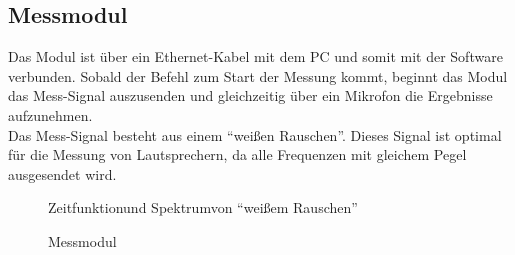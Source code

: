 \newpage
\subsection{Messmodul}\label{subsec:5.2.2}
Das Modul ist über ein Ethernet-Kabel mit dem PC und somit mit der Software verbunden. Sobald der Befehl zum Start der Messung kommt, beginnt das Modul das Mess-Signal auszusenden und gleichzeitig über ein Mikrofon die Ergebnisse aufzunehmen.\\
Das Mess-Signal besteht aus einem \enquote{weißen Rauschen}. Dieses Signal ist optimal für die Messung von Lautsprechern, da alle Frequenzen mit gleichem Pegel ausgesendet wird.
\begin{figure} [H]
	\centering
	\caption[Zeitfunktion und Spektrum von \enquote{weißem Rauschen}]{Zeitfunktion\footnotemark und Spektrum\footnotemark von \enquote{weißem Rauschen}}
	\label{fig:5.2.2.1}
\end{figure}
\begin{figure} [H]
	\centering
	\caption{Messmodul}
	\label{fig:5.2.2.2}
\end{figure}


